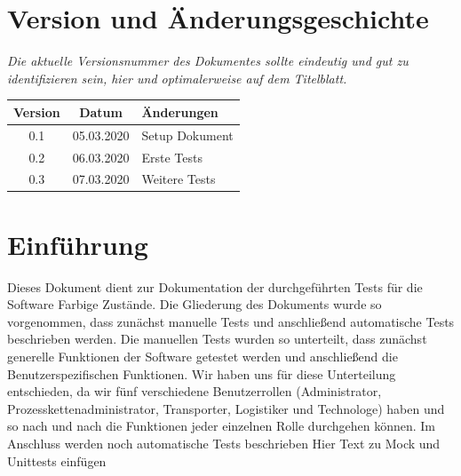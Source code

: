 \documentclass[enabledeprecatedfontcommands,fontsize=12pt,paper=a4,twoside]{scrartcl}
\begin{document}


\newpage

  \thispagestyle{fancy}
  \fancyhead{}
  \fancyfoot{}
  \renewcommand{\headrulewidth}{0.4pt}
  \tableofcontents

\newpage





\section*{Version und Änderungsgeschichte}

{\em Die aktuelle Versionsnummer des Dokumentes sollte eindeutig und gut zu
identifizieren sein, hier und optimalerweise auf dem Titelblatt.}

\begin{tabular}{ccl}
Version & Datum & Änderungen \\
\hline
0.1 & 05.03.2020 & Setup Dokument \\
0.2 & 06.03.2020 & Erste Tests \\
0.3 & 07.03.2020 & Weitere Tests\\
\end{tabular}



\newpage
\section{Einführung}

Dieses Dokument dient zur Dokumentation der durchgeführten Tests für die Software Farbige Zustände. Die Gliederung des Dokuments wurde so vorgenommen, dass zunächst manuelle Tests und anschließend automatische Tests beschrieben werden. Die manuellen Tests wurden so unterteilt, dass zunächst generelle Funktionen der Software getestet werden und anschließend die Benutzerspezifischen Funktionen. Wir haben uns für diese Unterteilung entschieden, da wir fünf verschiedene Benutzerrollen (Administrator, Prozesskettenadministrator, Transporter, Logistiker und Technologe) haben und so nach und nach die Funktionen jeder einzelnen Rolle durchgehen können. Im Anschluss werden noch automatische Tests beschrieben {\color{orange} Hier Text zu Mock und Unittests einfügen}
\end{document}
